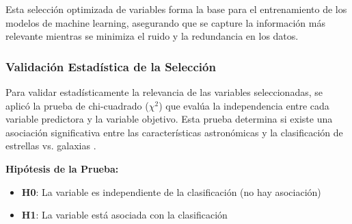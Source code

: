 \documentclass{article}
\begin{document}

Esta selección optimizada de variables forma la base para el entrenamiento de los modelos de machine learning, asegurando que se capture la información más relevante mientras se minimiza el ruido y la redundancia en los datos.

\subsubsection{Validación Estadística de la Selección}

Para validar estadísticamente la relevancia de las variables seleccionadas, se aplicó la prueba de chi-cuadrado ($\chi^2$) que evalúa la independencia entre cada variable predictora y la variable objetivo. Esta prueba determina si existe una asociación significativa entre las características astronómicas y la clasificación de estrellas vs. galaxias \cite{chi2_test}.

\textbf{Hipótesis de la Prueba:}
\begin{itemize}
    \item \textbf{H0}: La variable es independiente de la clasificación (no hay asociación)
    \item \textbf{H1}: La variable está asociada con la clasificación
\end{itemize}
\end{document}
